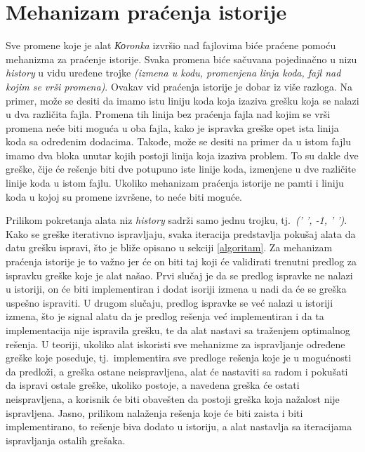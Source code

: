 \documentclass[12pt,oneside]{memoir}
\theoremstyle{plain}
\theoremstyle{definition}
\begin{document}
\section{Mehanizam praćenja istorije}\label{istorija}
Sve promene koje je alat \textit{Коronka} izvršio nad fajlovima biće praćene pomoću mehanizma za praćenje istorije. Svaka promena biće sačuvana pojedinačno u nizu \textit{history} u vidu uređene trojke \textit{(izmena u kodu, promenjena linja koda, fajl nad kojim se vrši promena)}. Ovakav vid praćenja istorije je dobar iz više razloga. Na primer, može se desiti da imamo istu liniju koda koja izaziva grešku koja se nalazi u dva različita fajla. Promena tih linija bez praćenja fajla nad kojim se vrši promena neće biti moguća u oba fajla, kako je ispravka greške opet ista linija koda sa određenim dodacima. Takođe, može se desiti na primer da u istom fajlu imamo dva bloka unutar kojih postoji linija koja izaziva problem. To su dakle dve greške, čije će rešenje biti dve potupuno iste linije koda, izmenjene u dve različite linije koda u istom fajlu. Ukoliko mehanizam praćenja istorije ne pamti i liniju koda u kojoj su promene izvršene, to neće biti moguće.  

Prilikom pokretanja alata niz \textit{history} sadrži samo jednu trojku, tj.~\textit{(' ', -1, ' ')}. Kako se greške iterativno ispravljaju, svaka iteracija predstavlja pokušaj alata da datu grešku ispravi, što je bliže opisano u sekciji \ref{algoritam}. Za mehanizam praćenja istorije je to važno jer će on biti taj koji će validirati trenutni predlog za ispravku greške koje je alat našao. Prvi slučaj je da se predlog ispravke ne nalazi u istoriji, on će biti implementiran i dodat isoriji izmena u nadi da će se greška uspešno ispraviti. U drugom slučaju, predlog ispravke se već nalazi u istoriji izmena, što je signal alatu da je predlog rešenja već implementiran i da ta implementacija nije ispravila grešku, te da alat nastavi sa traženjem optimalnog rešenja. U teoriji, ukoliko alat iskoristi sve mehanizme za ispravljanje određene greške koje poseduje, tj.~implementira sve predloge rešenja koje je u mogućnosti da predloži, a greška ostane neispravljena, alat će nastaviti sa radom i pokušati da ispravi ostale greške, ukoliko postoje, a navedena greška će ostati neispravljena, a korisnik će biti obavešten da postoji greška koja nažalost nije ispravljena. Jasno, prilikom nalaženja rešenja koje će biti zaista i biti implementirano, to rešenje biva dodato u istoriju, a alat nastavlja sa iteracijama ispravljanja ostalih grešaka.
\end{document}
